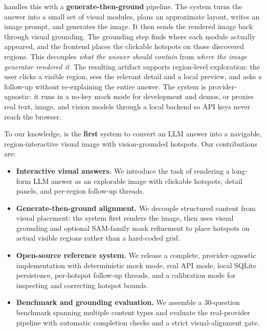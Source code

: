 \method{} handles this with a \textbf{generate-then-ground} pipeline. The
system turns the answer into a small set of visual modules, plans an
approximate layout, writes an image prompt, and generates the image. It then
sends the rendered image back through visual grounding. The grounding step finds where
each module actually appeared, and the frontend places the clickable hotspots
on those discovered regions. This decouples \emph{what the answer should
contain} from \emph{where the image generator rendered it}. The resulting
artifact supports region-level exploration: the user clicks a visible region,
sees the relevant detail and a local preview, and asks a follow-up without
re-explaining the entire answer. The system is provider-agnostic: it runs in a
no-key mock mode for development and demos, or proxies real text, image, and
vision models through a local backend so API keys never reach the browser.

To our knowledge, \method{} is the \textbf{first} system to convert an LLM
answer into a navigable, region-interactive visual image with vision-grounded
hotspots. Our contributions are:
\begin{itemize}
    \item \textbf{Interactive visual answers.} We introduce the task of
    rendering a long-form LLM answer as an explorable image with clickable
    hotspots, detail panels, and per-region follow-up threads.
    \item \textbf{Generate-then-ground alignment.} We decouple structured
    content from visual placement: the system first renders the image, then
    uses visual grounding and optional SAM-family mask refinement to place
    hotspots on actual visible regions rather than a hard-coded grid.
    \item \textbf{Open-source reference system.} We release a complete,
    provider-agnostic implementation with deterministic mock mode, real API
    mode, local SQLite persistence, per-hotspot follow-up threads, and a
    calibration mode for inspecting and correcting hotspot bounds.
    \item \textbf{Benchmark and grounding evaluation.} We assemble a 30-question
    benchmark spanning multiple content types and evaluate the real-provider
    pipeline with automatic completion checks and a strict visual-alignment
    gate.
\end{itemize}
